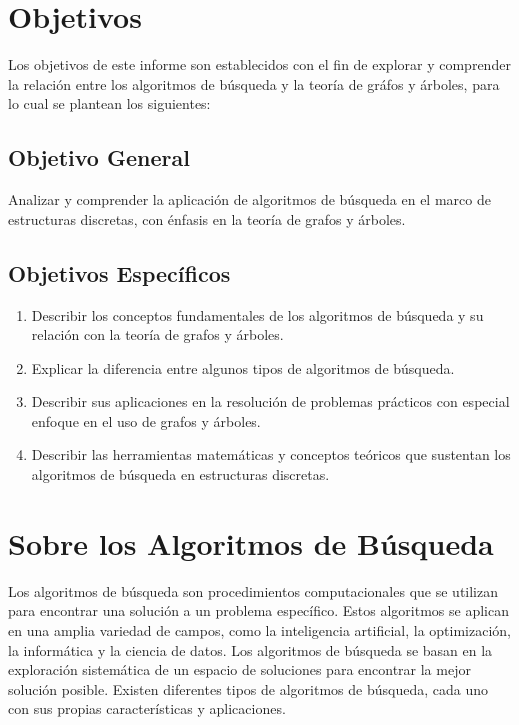 \documentclass[11pt, a4paper]{article}
\begin{document}
  
\vspace*{\fill}

\newpage

\section{Objetivos}

  Los objetivos de este informe son establecidos con el fin de explorar y comprender la relación entre los algoritmos de búsqueda y la teoría de gráfos y árboles, para lo cual se plantean los siguientes:

  \subsection{Objetivo General}

  Analizar y comprender la aplicación de algoritmos de búsqueda en el marco de estructuras discretas, con énfasis en la teoría de grafos y árboles.

  \subsection{Objetivos Específicos}

  \begin{enumerate}
    \item Describir los conceptos fundamentales de los algoritmos de búsqueda y su relación con la teoría de grafos y árboles.
    \item Explicar la diferencia entre algunos tipos de algoritmos de búsqueda.
    \item Describir sus aplicaciones en la resolución de problemas prácticos con especial enfoque en el uso de grafos y árboles.
    \item Describir las herramientas matemáticas y conceptos teóricos que sustentan los algoritmos de búsqueda en estructuras discretas.
  \end{enumerate}

  \newpage

  \section{Sobre los Algoritmos de Búsqueda}

  Los algoritmos de búsqueda son procedimientos computacionales que se utilizan para encontrar una solución a un problema específico. Estos algoritmos se aplican en una amplia variedad de campos, como la inteligencia artificial, la optimización, la informática y la ciencia de datos. Los algoritmos de búsqueda se basan en la exploración sistemática de un espacio de soluciones para encontrar la mejor solución posible. Existen diferentes tipos de algoritmos de búsqueda, cada uno con sus propias características y aplicaciones.
\end{document}
